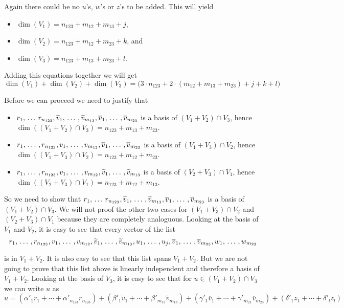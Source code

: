 \begin{xrcs}
  Again there could be no $u$'s, $w$'s or $z$'s to be added. This will yield
  \begin{itemize}
    \item $\dim (V_1) = n_{123} + m_{12} + m_{13} + j$,
    \item $\dim (V_2) = n_{123} + m_{12} + m_{23} + k$, and
    \item $\dim (V_3) = n_{123} + m_{13} + m_{23} + l$.
  \end{itemize}

  Adding this equations together we will  get
  \begin{equation}
    \label{eq: dim V_1 + dim V_2 + dim V_3}
      \dim (V_1)+ \dim (V_2) + \dim (V_3) = \Big(3 \cdot n_{123} + 2 \cdot (m_{12}+m_{13}+m_{23})+j+k+l \Big)
  \end{equation}

  Before we can proceed we need to justify that
  \begin{itemize}
    \item $r_1,  {\, \ldots \,\,} r_{n_{123}} ,  \widetilde{v}_1, {\, \ldots \,\,}, \widetilde{v}_{m_{13}}, \overline{v}_1, {\, \ldots \,\,}, \overline{v}_{m_{23}}$ is a basis of $(V_1+V_2) \cap V_3$, hence $\dim ((V_1+V_2) \cap V_3) = n_{123} + m_{13}+m_{23}$.
    \item $r_1, {\, \ldots \,\,}, r_{n_{123}}, v_1, {\, \ldots \,\,}, v_{m_{12}}, \overline{v}_1, {\, \ldots \,\,}, \overline{v}_{m_{23}}$ is a basis of $(V_1+V_3) \cap V_2$, hence $\dim ((V_1+V_3) \cap V_2) = n_{123} + m_{12}+m_{23}$.
    \item $r_1, {\, \ldots \,\,}, r_{n_{123}}, v_1, {\, \ldots \,\,}, v_{m_{12}}, \widetilde{v}_1, {\, \ldots \,\,}, \widetilde{v}_{m_{13}}$ is a basis of $(V_2+V_3) \cap V_1$, hence $\dim ((V_2+V_3) \cap V_1) = n_{123} + m_{12}+m_{13}$.
  \end{itemize}

  So we need to show that $r_1,  {\, \ldots \,\,} r_{n_{123}} ,  \widetilde{v}_1, {\, \ldots \,\,}, \widetilde{v}_{m_{13}}, \overline{v}_1, {\, \ldots \,\,}, \overline{v}_{m_{23}}$ is a basis of $(V_1+V_2) \cap V_3$. We will not proof the other two cases for $(V_1+V_3) \cap V_2$ and $(V_2 + V_3) \cap V_1$ because they are completely analoguous. Looking at the basis of $V_1$ and $V_2$, it is easy to see that every vector of the list
  \begin{equation}
    r_1, {\, \ldots \,\,}, r_{n_{123}}, v_1, {\, \ldots \,\,}, v_{m_{12}}, \widetilde{v}_1, {\, \ldots \,\,}, \widetilde{v}_{m_{13}}, u_1, {\, \ldots \,\,}, u_j, \overline{v}_1, {\, \ldots \,\,}, \overline{v}_{m_{23}}, w_1, {\, \ldots \,\,}, w_{m_{23}}
  \end{equation}

  is in $V_1 + V_2$. It is also easy to see that this list spans $V_1 + V_2$. But we are not going to prove that this list above is linearly independent and therefore a basis of $V_1+V_2$. Looking at the basis of $V_3$, it is easy to see that for $u \in (V_1 + V_2) \cap V_3$ we can write $u$ as
  \begin{equation}
    u = (\alpha'_1 r_1+ \cdots+ \alpha'_{n_{123}} r_{n_{123}})
    + (\beta'_1 \widetilde{v}_1+ \cdots+ \beta'_{m_{13}} \widetilde{v}_{m_{13}})
    + (\gamma'_1 \overline{v}_1+ \cdots+ \gamma'_{m_{21}} \overline{v}_{m_{23}})
    + (\delta'_1 z_1+\cdots+ \delta'_l z_l)
  \end{equation}


\end{xrcs}
